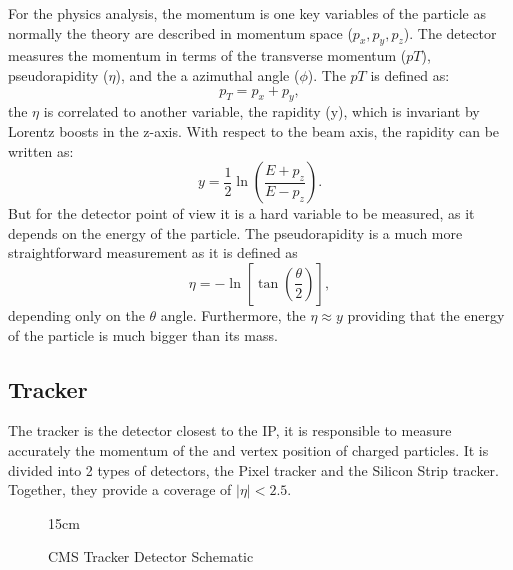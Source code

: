 For the physics analysis, the momentum is one key variables of the particle as normally the theory are described in momentum space ($p_x, p_y, p_z$). The detector measures the momentum in terms of the transverse momentum ($pT$), pseudorapidity ($\eta$), and the a azimuthal angle ($\phi$). The $pT$ is defined as:
\begin{equation}
    p_T = p_x + p_y,
\end{equation}
the $\eta$ is correlated to another variable, the rapidity (y), which is invariant by Lorentz boosts in the z-axis. With respect to the beam axis, the rapidity can be written as:
\begin{equation}
    y = \frac{1}{2} \ln{\left( \frac{E + p_z}{E - p_z} \right)}.
\end{equation}
But for the detector point of view it is a hard variable to be measured, as it depends on the energy of the particle. The pseudorapidity is a much more straightforward measurement as it is defined as
\begin{equation}
    \eta = - \ln {\left[ \tan{\left( \frac{\theta}{2} \right)} \right]},
\end{equation}
depending only on the $\theta$ angle. Furthermore, the $\eta \approx y$ providing that the energy of the particle is much bigger than its mass.

\subsection{Tracker}

The tracker is the detector closest to the IP, it is responsible to measure accurately the momentum of the and vertex position of charged particles. It is divided into 2 types of detectors, the Pixel tracker and the Silicon Strip tracker. Together, they provide a coverage of $|\eta| < 2.5$.

\begin{figure}[!htm]{15cm} %
\caption{CMS Tracker Detector Schematic}%
\label{fig:tracker_layout}
\end{figure}

